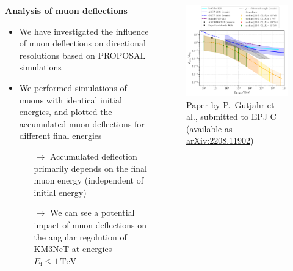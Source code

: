 \begin{frame}[c]
    \begin{columns}[onlytextwidth]
    \begin{column}{0.45\textwidth}
        \textbf{Analysis of muon deflections}
        \begin{itemize}
            \item We have investigated the influence of muon deflections on directional resolutions based on PROPOSAL simulations
            \item We performed simulations of muons with identical initial energies, and plotted the accumulated muon deflections for different final energies
            \begin{itemize}
                \item[$\rightarrow$] Accumulated deflection primarily depends on the final muon energy (independent of initial energy)
                \item[$\rightarrow$] We can see a potential impact of muon deflections on the angular regolution of KM3NeT at energies $E_\text{f} \leq \SI{1}{\tera\electronvolt}$
            \end{itemize} 
        \end{itemize}

    \end{column}
        \begin{column}{0.55\textwidth}
    		\begin{figure}
    		  \includegraphics[width=\linewidth, height=.85\textheight, keepaspectratio]{plots/fit_median_defl_cut_10percent_only_poly_new_resolution_rescale_no_icecube_paper_final_all.pdf}
    		  \captionsetup{justification=centering}
    		  \caption*{Paper by P.~Gutjahr et al., submitted to EPJ C \\(available as \href{https://arxiv.org/abs/2208.11902}{arXiv:2208.11902})}
    		\end{figure}

        \end{column}
    \end{columns}
\end{frame}
